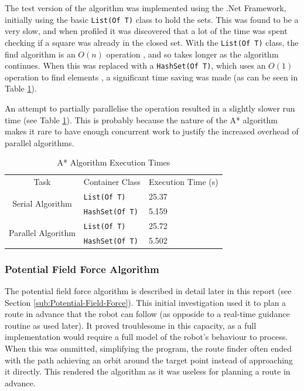 \documentclass[10pt]{article}
\begin{document}
The test version of the algorithm was implemented using the .Net Framework,
initially using the basic \texttt{List(Of T)} class to hold the sets.  This was
found to be a very slow, and when profiled it was discovered that a lot of the
time was spent checking if a square was already in the closed set.  With the
\texttt{List(Of T)} class, the find algorithm is an $O(n)$ operation
\cite{msdnListOfT}, and so takes longer as the algorithm continues.  When this
was replaced with a \texttt{HashSet(Of T)}, which uses an $O(1)$ operation to
find elements \cite{msdnHashSetOfT}, a significant time saving was made (as can
be seen in Table \ref{tab:aStarTimingsTable}).

An attempt to partially parallelise the operation resulted in a slightly slower
run time (see Table \ref{tab:aStarTimingsTable}). This is probably because the
nature of the A* algorithm makes it rare to have enough concurrent work to
justify the increased overhead of parallel algorithms.

\begin{singlespace}
\begin{table}
\centering%
\begin{tabular}{|c|m{3cm}|p{2cm}|}
\hline
\multirow{2}{*}{Task} & \multirow{2}{3cm}{Container Class} &
\multirow{2}{2cm}{Execution Time (\si{\second})} \\
 &  & \\
\hline
\multirow{2}{*}{Serial Algorithm} & \texttt{List(Of T)} & \num{25.37}
\\
\cline{2-3}
 & \texttt{HashSet(Of T)} & \num{5.159} \\
\hline
\multirow{2}{*}{Parallel Algorithm} & \texttt{List(Of T)} & \num{25.72}
\\
\cline{2-3}
 & \texttt{HashSet(Of T)} & \num{5.502} \\
\hline
\end{tabular}

\caption{A* Algorithm Execution Times\label{tab:aStarTimingsTable}}
\end{table}

\end{singlespace}

\subsubsection{Potential Field Force Algorithm}

The potential field force algorithm is described in detail later in this report
(see Section \ref{sub:Potential-Field-Force}).  This initial investigation used
it to plan a route in advance that the robot can follow (as opposide to a
real-time guidance routine as used later).  It proved troublesome in this
capacity, as a full implementation would require a full model of the robot's
behaviour to process.  When this was ommitted, simplifying the program, the
route finder often ended with the path achieving an orbit around the target
point instead of approaching it directly.  This rendered the algorithm as it was
useless for planning a route in advance.
\end{document}
